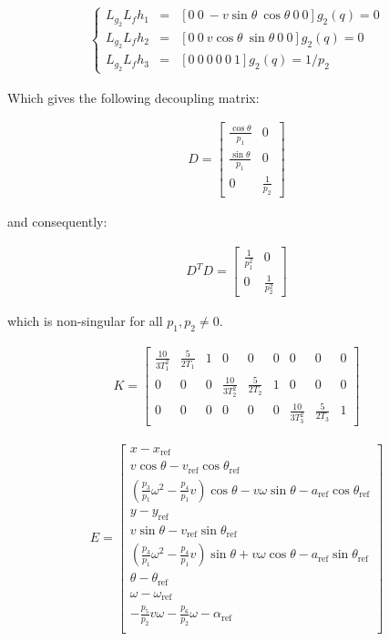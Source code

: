 \documentclass[letterpaper, 10 pt, conference]{ieeeconf}  %
\begin{document}
\begin{eqnarray}
\left\lbrace\begin{array}{lcl}
L_{g_2}L_{f}h_1 & = & [0\ 0\ -v\sin\theta\ \cos\theta\ 0\ 0]g_2(q) = 0\\
L_{g_2}L_{f}h_2 & = & [0\ 0\ v\cos\theta\ \sin\theta\ 0\ 0]g_2(q) = 0\\
L_{g_2}L_{f}h_3 & = & [0\ 0\ 0\ 0\ 0\ 1]g_2(q) = 1/p_2
\end{array}\right.
\end{eqnarray}

Which gives the following decoupling matrix:

\begin{eqnarray}
D = 
\left[\begin{array}{cc}
\frac{\cos\theta}{p_1} & 0\\
\frac{\sin\theta}{p_1} & 0\\
0 & \frac{1}{p_2}
\end{array}\right]
\end{eqnarray}

and consequently:

\begin{eqnarray}
D^TD = 
\left[\begin{array}{cc}
\frac{1}{p_1^2} & 0\\
0 & \frac{1}{p_2^2}
\end{array}\right]
\end{eqnarray}

which is non-singular for all $p_1, p_2 \neq 0$.

\begin{eqnarray}
K =
\left[\begin{array}{ccccccccc}
\frac{10}{3T_1^2} & \frac{5}{2T_1} & 1 & 0 & 0 & 0 & 0 & 0 & 0\\
0 & 0 & 0 & \frac{10}{3T_2^2} & \frac{5}{2T_2} & 1 & 0 & 0 & 0\\
0 & 0 & 0 & 0 & 0 & 0 & \frac{10}{3T_3^2} & \frac{5}{2T_3} & 1
\end{array}\right]
\end{eqnarray}

\begin{eqnarray}
E =
\left[\begin{array}{c}
x - x_{\text{ref}}\\
v\cos\theta - v_{\text{ref}}\cos\theta_{\text{ref}}\\
\left(\frac{p_3}{p_1}\omega^2 - \frac{p_4}{p_1}v\right)\cos\theta - v\omega\sin\theta - a_{\text{ref}}\cos{\theta_{\text{ref}}}\\
y - y_{\text{ref}}\\
v\sin\theta - v_{\text{ref}}\sin{\theta_{\text{ref}}}\\
\left(\frac{p_3}{p_1}\omega^2 - \frac{p_4}{p_1}v\right)\sin\theta + v\omega\cos\theta - a_{\text{ref}}\sin{\theta_{\text{ref}}}\\
\theta - \theta_{\text{ref}}\\
\omega - \omega_{\text{ref}}\\
-\frac{p_5}{p_2}v\omega - \frac{p_6}{p_2}\omega - \alpha_{\text{ref}}\\
\end{array}\right]
\end{eqnarray}
\end{document}
